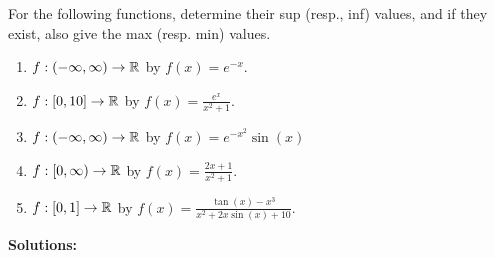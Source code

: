 \begin{example} For the following functions, determine their sup (resp., inf) values, and if they exist, also give the max (resp. min) values.

\begin{enumerate}
\renewcommand{\labelenumi}{(\alph{enumi})}
\setlength{\itemsep}{.2cm}
    \item  $f:(-\infty, \infty) \to \mathbb R$ by $f(x) = e^{-x}$.

    \item  $f:[0, 10] \to \mathbb R$ by $f(x) = \frac{e^{x}}{x^2 + 1}$. 

        
    \item   $f:(-\infty, \infty) \to \mathbb R$ by $f(x) = e^{-x^2} \sin(x)$

    \item  $f:[0, \infty) \to \mathbb R$ by $f(x) = \frac{2x + 1}{x^2 + 1}$.

    \item  $f:[0, 1] \to \mathbb R$ by $f(x) = \frac{\tan(x) - x^3}{x^2 + 2 x \sin(x) + 10}$.
    
\end{enumerate}
    
\end{example}

\textbf{Solutions:}

